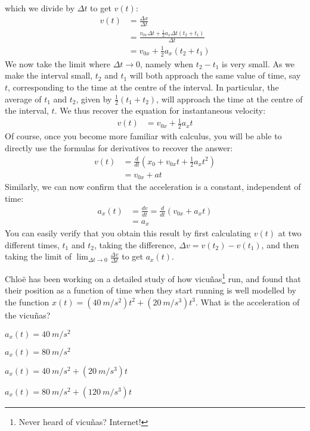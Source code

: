 which we divide by $\Delta t$ to get $v(t)$:
\begin{align*}
v(t) &= \frac{\Delta x}{\Delta t}\\
&=\frac{v_{0x}\Delta t+\frac{1}{2}a_x\Delta t (t_2+t_1)}{\Delta t}\\
&=v_{0x}+\frac{1}{2}a_x(t_2+t_1)
\end{align*}
We now take the limit where $\Delta t\to 0$, namely when $t_2-t_1$ is very small. As we make the interval small, $t_2$ and $t_1$ will both approach the same value of time, say $t$, corresponding to the time at the centre of the interval. In particular, the average of $t_1$ and $t_2$, given by $\frac{1}{2}(t_1+t_2)$, will approach the time at the centre of the interval, $t$. We thus recover the equation for instantaneous velocity:
\begin{align*}
v(t) &= v_{0x}+\frac{1}{2}a_xt
\end{align*}
Of course, once you become more familiar with calculus, you will be able to directly use the formulas for derivatives to recover the answer:
\begin{align*}
v(t) &= \frac{d}{dt}\left( x_0+v_{0x}t+\frac{1}{2}a_xt^2 \right) \\
     &= v_{0x}+at 
\end{align*}
Similarly, we can now confirm that the acceleration is a constant, independent of time:
\begin{align*}
a_x(t) &= \frac{dv}{dt} = \frac{d}{dt}\left(v_{0x}+a_xt \right)\\
     &=a_x
\end{align*}
You can easily verify that you obtain this result by first calculating $v(t)$ at two different times, $t_1$ and $t_2$, taking the difference, $\Delta v = v(t_2)-v(t_1)$, and then taking the limit of $\lim_{\Delta t\to 0}\frac{\Delta v}{\Delta t}$ to get $a_x(t)$.

\begin{checkpointMC}{Chlo\"e has been working on a detailed study of how vicu\~nas\footnote{Never heard of vicu\~nas? Internet!} run, and found that their position as a function of time when they start running is well modelled by the function $x(t)=(\SI{40}{m/s^2})t^2+(\SI{20}{m/s^3})t^3$. What is the acceleration of the vicu\~nas?}
\item $a_x(t)=\SI{40}{m/s^2}$
\item $a_x(t)=\SI{80}{m/s^2}$
\item $a_x(t)=\SI{40}{m/s^2}+(\SI{20}{m/s^3})t$
\item $a_x(t)=\SI{80}{m/s^2}+(\SI{120}{m/s^3})t$ %
\end{checkpointMC}


